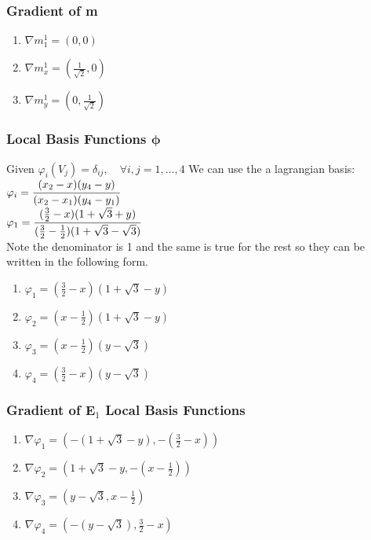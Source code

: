 \documentclass{article}
\begin{document}
{\subsubsection{Gradient of m}
\begin{enumerate}
    \item $\nabla m_1^1 = (0,0)$
    \item $\nabla m_x^1 = (\frac{1}{\sqrt{2}},0)$ 
    \item $\nabla m_y^1 = (0,\frac{1}{\sqrt{2}})$ 
\end{enumerate}


\subsubsection{Local Basis Functions $\mathbf{\phi}$}
Given $\varphi_i(V_j) = \delta_{ij}, \quad \forall i,j = 1, \ldots ,4$
We can use the a lagrangian basis:
$\varphi_i = \cfrac{(x_2-x)(y_4-y)}{(x_2-x_1)(y_4-y_1)}$\\

$\varphi_1 = \cfrac{(\frac{3}{2} - x)(1+\sqrt{3} + y)}{(\frac{3}{2}-\frac{1}{2})(1+\sqrt{3} - \sqrt{3})}$\\
Note the denominator is 1 and the same is true for the rest so they can be written in the following form.\\
\begin{enumerate}
    \item $\varphi_1 = (\frac{3}{2} - x)(1 + \sqrt{3} - y)$
    \item $\varphi_2 = (x - \frac{1}{2})(1 + \sqrt{3} - y)$
    \item $\varphi_3 = (x - \frac{1}{2} )(y - \sqrt{3})$
    \item $\varphi_4 = (\frac{3}{2} - x)(y - \sqrt{3})$
\end{enumerate}


\subsubsection{Gradient of E$_1$ Local Basis Functions}
\begin{enumerate}
    \item $\nabla\varphi_1 = \left(-(1 + \sqrt{3} - y),  -(\frac{3}{2}-x)\right)$
    \item $\nabla\varphi_2 = \left(1 + \sqrt{3} - y,-(x - \frac{1}{2})\right)$
    \item $\nabla\varphi_3 = \left(y - \sqrt{3},x - \frac{1}{2}\right)$
    \item $\nabla\varphi_4 = \left(-(y-\sqrt{3}),\frac{3}{2}-x\right)$
\end{enumerate}


}
\end{document}
